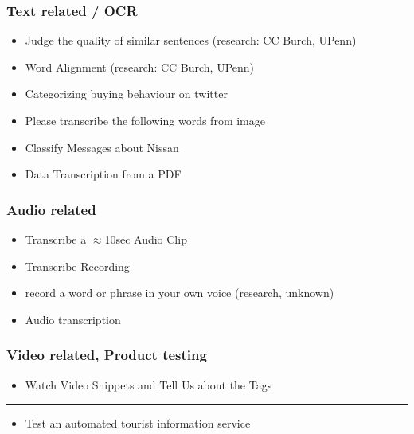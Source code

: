 \documentclass[slides]{beamer} %
\begin{document}
\begin{frame}\frametitle{Text related / OCR}

\begin{itemize} %
\item Judge the quality of similar sentences (research: CC Burch, UPenn)
\item Word Alignment (research: CC Burch, UPenn)
\item Categorizing buying behaviour on twitter
\item Please transcribe the following words from image
\item Classify Messages about Nissan
\item Data Transcription from a PDF
\end{itemize}

\end{frame}

\begin{frame}\frametitle{Audio related}

\begin{itemize} %
\item Transcribe a $\approx$10sec Audio Clip
\item Transcribe Recording 
\item record a word or phrase in your own voice (research, unknown)
\item Audio transcription
\end{itemize}

\end{frame}

\begin{frame}\frametitle{Video related, Product testing}

\begin{itemize} %
\item Watch Video Snippets and Tell Us about the Tags
\end{itemize}

\noindent\rule{10cm}{0.4pt}

\begin{itemize} %
\item Test an automated tourist information service
\end{itemize}

\end{frame}
\end{document}
